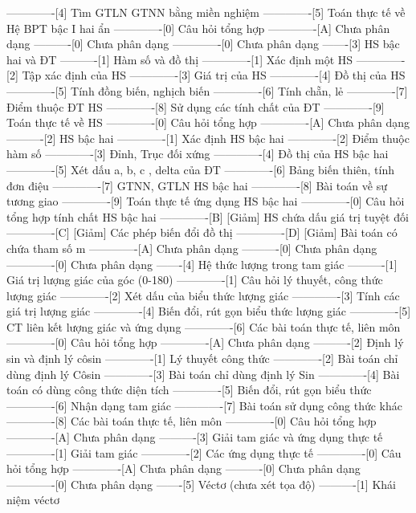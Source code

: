 -------------[4] Tìm GTLN GTNN bằng miền nghiệm
-------------[5] Toán thực tế về Hệ BPT bậc I hai ẩn
-------------[0] Câu hỏi tổng hợp
-------------[A] Chưa phân dạng
----------[0] Chưa phân dạng
-------------[0] Chưa phân dạng
-------[3] HS bậc hai và ĐT
----------[1] Hàm số và đồ thị
-------------[1] Xác định một HS
-------------[2] Tập xác định của HS
-------------[3] Giá trị của HS
-------------[4] Đồ thị của HS
-------------[5] Tính đồng biến, nghịch biến
-------------[6] Tính chẵn, lẻ
-------------[7] Điểm thuộc ĐT HS
-------------[8] Sử dụng các tính chất của ĐT
-------------[9] Toán thực tế về HS
-------------[0] Câu hỏi tổng hợp
-------------[A] Chưa phân dạng
----------[2] HS bậc hai
-------------[1] Xác định HS bậc hai
-------------[2] Điểm thuộc hàm số
-------------[3] Đỉnh, Trục đối xứng
-------------[4] Đồ thị của HS bậc hai
-------------[5] Xét dấu a, b, c , delta của ĐT
-------------[6] Bảng biến thiên, tính đơn điệu
-------------[7] GTNN, GTLN HS bậc hai
-------------[8] Bài toán về sự tương giao
-------------[9] Toán thực tế ứng dụng HS bậc hai
-------------[0] Câu hỏi tổng hợp tính chất HS bậc hai
-------------[B] [Giảm] HS chứa dấu giá trị tuyệt đối
-------------[C] [Giảm] Các phép biến đổi đồ thị 
-------------[D] [Giảm] Bài toán có chứa tham số m
-------------[A] Chưa phân dạng
----------[0] Chưa phân dạng
-------------[0] Chưa phân dạng
-------[4] Hệ thức lượng trong tam giác
----------[1] Giá trị lượng giác của góc (0-180)
-------------[1] Câu hỏi lý thuyết, công thức lượng giác
-------------[2] Xét dấu của biểu thức lượng giác
-------------[3] Tính các giá trị lượng giác
-------------[4] Biến đổi, rút gọn biểu thức lượng giác
-------------[5] CT liên kết lượng giác và ứng dụng
-------------[6] Các bài toán thực tế, liên môn
-------------[0] Câu hỏi tổng hợp
-------------[A] Chưa phân dạng
----------[2] Định lý sin và định lý côsin
-------------[1] Lý thuyết công thức
-------------[2] Bài toán chỉ dùng định lý Côsin
-------------[3] Bài toán chỉ dùng định lý Sin 
-------------[4] Bài toán có dùng công thức diện tích
-------------[5] Biến đổi, rút gọn biểu thức
-------------[6] Nhận dạng tam giác
-------------[7] Bài toán sử dụng công thức khác
-------------[8] Các bài toán thực tế, liên môn
-------------[0] Câu hỏi tổng hợp
-------------[A] Chưa phân dạng
----------[3] Giải tam giác và ứng dụng thực tế
-------------[1] Giải tam giác
-------------[2] Các ứng dụng thực tế
-------------[0] Câu hỏi tổng hợp
-------------[A] Chưa phân dạng
----------[0] Chưa phân dạng
-------------[0] Chưa phân dạng
-------[5] Véctơ (chưa xét tọa độ)
----------[1] Khái niệm véctơ
